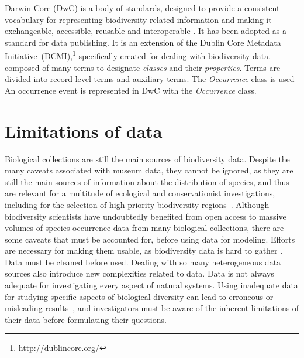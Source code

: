 Darwin Core (DwC) is a body of standards, designed to provide a consistent vocabulary for representing biodiversity-related information and making it exchangeable, accessible, reusable and interoperable \cite{Wieczorek2012}.
It has been adopted as a standard for data publishing.
It is an extension of the Dublin Core Metadata Initiative~(DCMI),\footnote{\url{http://dublincore.org/}} specifically created for dealing with biodiversity data.
composed of many terms to designate \textit{classes} and their \textit{properties}.
Terms are divided into record-level terms and auxiliary terms.
The \textit{Occurrence} class is used
An occurrence event is represented in DwC with the \textit{Occurrence} class. 






\section{Limitations of data} 
\label{section:limitdata}


Biological collections are still the main sources of biodiversity data. %
Despite the many caveats associated with museum data, they cannot be ignored, as they are still the main sources of information about the distribution of species, and thus are relevant for a multitude of ecological and conservationist investigations, including for the selection of high-priority biodiversity regions~\cite{Funk2002}. 
Although biodiversity scientists have undoubtedly benefited from open access to massive volumes of species occurrence data from many biological collections, there are some caveats that must be accounted for, before using data for modeling.
Efforts are necessary for making them usable, as biodiversity data is hard to gather \cite{}. 
Data must be cleaned before used.
Dealing with so many heterogeneous data sources also introduce new complexities related to data.
Data is not always adequate for investigating every aspect of natural systems.
Using inadequate data for studying specific aspects of biological diversity can lead to erroneous or misleading results~\cite{Chapman2005}, and investigators must be aware of the inherent limitations of their data before formulating their questions. %

